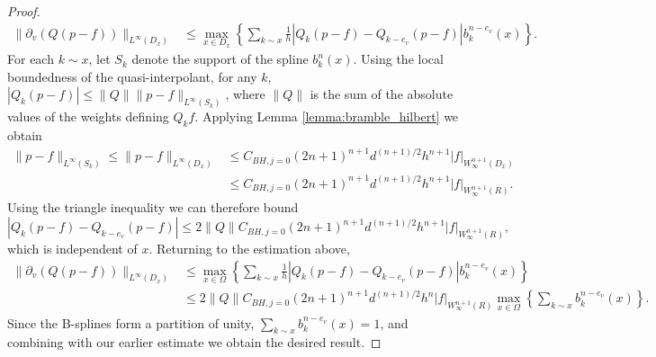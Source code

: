 \documentclass[10pt]{article}
\theoremstyle{definition}
\numberwithin{equation}{section}
\numberwithin{figure}{section}
\numberwithin{table}{section}
\begin{document}
\begin{proof}
\begin{align*}
\|\partial_v(Q(p-f))\|_{L^\infty(D_x)}&\leq \max_{x\in D_x}\left\{\sum_{k\sim x}\frac{1}{h}|Q_k(p-f)-Q_{k-e_v}(p-f)|b_k^{n-e_v}(x)\right\}.
\end{align*}
For each $k\sim x$, let $S_k$ denote the support of the spline $b_k^{n}(x)$. Using the local boundedness of the quasi-interpolant, for any $k$, $|Q_k(p-f)|\leq\|Q\|\|p-f\|_{L^\infty(S_k)}$, where $\|Q\|$ is the sum of the absolute values of the weights defining $Q_kf$. Applying Lemma \ref{lemma:bramble_hilbert} we obtain
\begin{align*}
\|p-f\|_{L^\infty(S_k)}\leq\|p-f\|_{L^\infty(D_x)}&\leq C_{BH,j=0}(2n+1)^{n+1}d^{(n+1)/2}h^{n+1}|f|_{W^{n+1}_\infty(D_x)}\\
&\leq C_{BH,j=0}(2n+1)^{n+1}d^{(n+1)/2}h^{n+1}|f|_{W^{n+1}_\infty(R)}.
\end{align*}
Using the triangle inequality we can therefore bound 
$$|Q_k(p-f)-Q_{k-e_v}(p-f)|\leq 2\|Q\|C_{BH,j=0}(2n+1)^{n+1}d^{(n+1)/2}h^{n+1}|f|_{W^{n+1}_\infty(R)},$$
which is independent of $x$. Returning to the estimation above, 
\begin{align*}
\|\partial_v(Q(p-f))\|_{L^\infty(D_x)}&\leq \max_{x\in\Omega}\left\{\sum_{k\sim x}\frac{1}{h}|Q_k(p-f)-Q_{k-e_v}(p-f)|b_k^{n-e_v}(x)\right\}\\
&\leq 2\|Q\|C_{BH,j=0}(2n+1)^{n+1}d^{(n+1)/2}h^{n}|f|_{W^{n+1}_\infty(R)}\max_{x\in\Omega}\left\{\sum_{k\sim x}b_k^{n-e_v}(x)\right\}.
\end{align*}
Since the B-splines form a partition of unity, $\sum_{k\sim x}b_k^{n-e_v}(x)=1$, and combining with our earlier estimate we obtain the desired result.

\end{proof}
\end{document}

